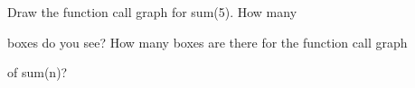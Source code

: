 Draw the function call graph for sum(5). How many

boxes do you see? How many boxes are there for the function call graph

of sum(n)?

